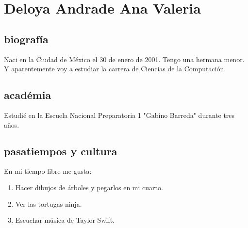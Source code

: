 \chapter{Deloya Andrade Ana Valeria}
\section{biografía}
Naci en la Ciudad de México el 30 de enero de 2001. Tengo una hermana menor. Y aparentemente voy a estudiar la carrera de Ciencias de la Computación. 
\section{académia}
Estudié en la Escuela Nacional Preparatoria 1 "Gabino Barreda" durante tres años.
\section{pasatiempos y cultura}
En mi tiempo libre me gusta:
\begin{enumerate}
\item Hacer dibujos de árboles y pegarlos en mi cuarto.
\item Ver las tortugas ninja.
\item Escuchar música de Taylor Swift.
\end{enumerate}
